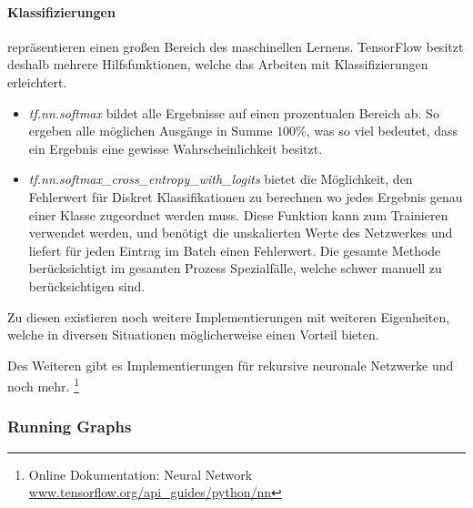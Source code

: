 \paragraph{Klassifizierungen} repräsentieren einen großen Bereich des maschinellen Lernens. 
TensorFlow besitzt deshalb mehrere Hilfsfunktionen, welche das Arbeiten mit Klassifizierungen erleichtert. 
\begin{itemize}
	\item \textit{tf.nn.softmax} bildet alle Ergebnisse auf einen prozentualen Bereich ab. 
	So ergeben alle möglichen Ausgänge in Summe $100\%$, was so viel bedeutet, dass ein Ergebnis eine gewisse Wahrscheinlichkeit besitzt. 
	\item \textit{tf.nn.softmax\_cross\_entropy\_with\_logits} bietet die Möglichkeit, den Fehlerwert für Diskret Klassifikationen zu berechnen wo jedes Ergebnis genau einer Klasse zugeordnet werden muss. 
	Diese Funktion kann zum Trainieren verwendet werden, und benötigt die unskalierten Werte des Netzwerkes und liefert für jeden Eintrag im Batch einen Fehlerwert. 
	Die gesamte Methode berücksichtigt im gesamten Prozess Spezialfälle, welche schwer manuell zu berücksichtigen sind. 
\end{itemize}
\phantom \newline

\noindent
Zu diesen existieren noch weitere Implementierungen mit weiteren Eigenheiten, welche in diversen Situationen möglicherweise einen Vorteil bieten. 
\phantom \newline

\noindent
Des Weiteren gibt es Implementierungen für rekursive neuronale Netzwerke und noch mehr. 
\footnote{Online Dokumentation: Neural Network \url{www.tensorflow.org/api_guides/python/nn}}

\subsubsection{Running Graphs}

